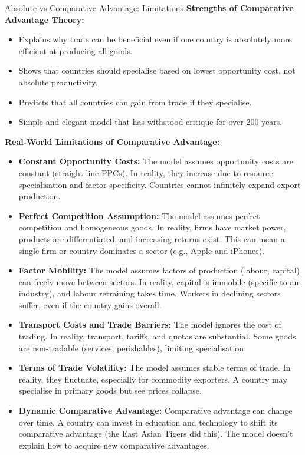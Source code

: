 \documentclass[11pt, a4paper, twoside]{book}
\begin{document}
\begin{evaluation}{Absolute vs Comparative Advantage: Limitations}
\textbf{Strengths of Comparative Advantage Theory:}
\begin{itemize}
  \item Explains why trade can be beneficial even if one country is absolutely more efficient at producing all goods.
  \item Shows that countries should specialise based on lowest opportunity cost, not absolute productivity.
  \item Predicts that all countries can gain from trade if they specialise.
  \item Simple and elegant model that has withstood critique for over 200 years.
\end{itemize}

\textbf{Real-World Limitations of Comparative Advantage:}
\begin{itemize}
  \item \textbf{Constant Opportunity Costs:} The model assumes opportunity costs are constant (straight-line PPCs). In reality, they increase due to resource specialisation and factor specificity. Countries cannot infinitely expand export production.
  \item \textbf{Perfect Competition Assumption:} The model assumes perfect competition and homogeneous goods. In reality, firms have market power, products are differentiated, and increasing returns exist. This can mean a single firm or country dominates a sector (e.g., Apple and iPhones).
  \item \textbf{Factor Mobility:} The model assumes factors of production (labour, capital) can freely move between sectors. In reality, capital is immobile (specific to an industry), and labour retraining takes time. Workers in declining sectors suffer, even if the country gains overall.
  \item \textbf{Transport Costs and Trade Barriers:} The model ignores the cost of trading. In reality, transport, tariffs, and quotas are substantial. Some goods are non-tradable (services, perishables), limiting specialisation.
  \item \textbf{Terms of Trade Volatility:} The model assumes stable terms of trade. In reality, they fluctuate, especially for commodity exporters. A country may specialise in primary goods but see prices collapse.
  \item \textbf{Dynamic Comparative Advantage:} Comparative advantage can change over time. A country can invest in education and technology to shift its comparative advantage (the East Asian Tigers did this). The model doesn't explain how to acquire new comparative advantages.

\end{itemize}
\end{evaluation}
\end{document}
